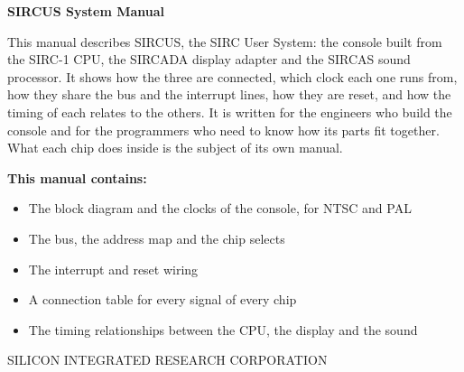 \clearpage
\thispagestyle{empty}
\begin{center}

	\vspace*{1.5cm}

	{\Large\bfseries SIRCUS System Manual}

	\vspace{1cm}

	\begin{minipage}{0.8\textwidth}
		This manual describes SIRCUS, the SIRC User System: the console built from the SIRC-1 CPU, the SIRCADA display
		adapter and the SIRCAS sound processor. It shows how the three are connected, which clock each one runs from, how
		they share the bus and the interrupt lines, how they are reset, and how the timing of each relates to the others. It
		is written for the engineers who build the console and for the programmers who need to know how its parts fit
		together. What each chip does inside is the subject of its own manual.

		\vspace{0.6cm}

		\textbf{This manual contains:}
		\begin{itemize}
			\item The block diagram and the clocks of the console, for NTSC and PAL
			\item The bus, the address map and the chip selects
			\item The interrupt and reset wiring
			\item A connection table for every signal of every chip
			\item The timing relationships between the CPU, the display and the sound
		\end{itemize}
	\end{minipage}

	\vfill

	{\small SILICON INTEGRATED RESEARCH CORPORATION}

\end{center}
